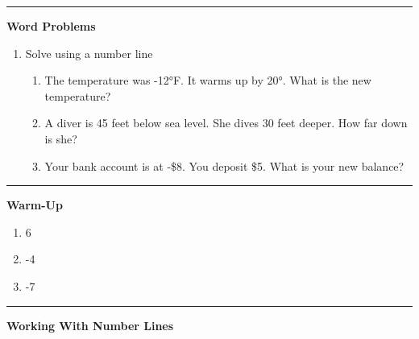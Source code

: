 \documentclass[
  letterpaper,
  DIV=11,
  numbers=noendperiod]{scrreprt}
\begin{document}
\begin{center}\rule{0.5\linewidth}{0.5pt}\end{center}

\textbf{Word Problems}

\begin{enumerate}
\def\labelenumi{\arabic{enumi}.}
\setcounter{enumi}{13}
\item
  Solve using a number line

  \begin{enumerate}
  \def\labelenumii{\alph{enumii}.}
  \item
    The temperature was -12°F. It warms up by 20°. What is the new
    temperature?
  \item
    A diver is 45 feet below sea level. She dives 30 feet deeper. How
    far down is she?
  \item
    Your bank account is at -\$8. You deposit \$5. What is your new
    balance?
  \end{enumerate}
\end{enumerate}

\begin{center}\rule{0.5\linewidth}{0.5pt}\end{center}

\textbf{Warm-Up}

\begin{enumerate}
\def\labelenumi{\arabic{enumi}.}
\item
  6
\item
  -4
\item
  -7
\end{enumerate}

\begin{center}\rule{0.5\linewidth}{0.5pt}\end{center}

\textbf{Working With Number Lines}
\end{document}
